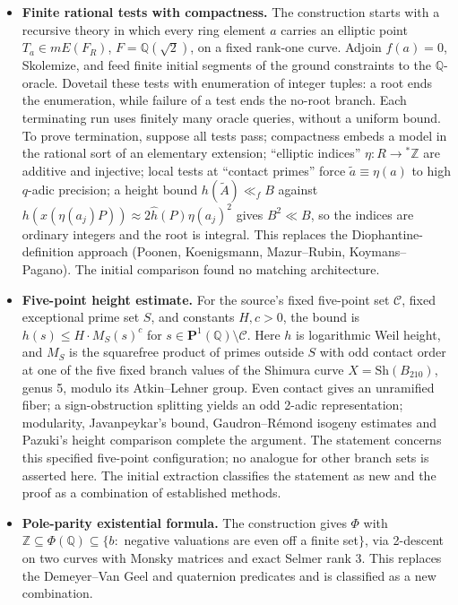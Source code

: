 \documentclass[11pt]{article}
\begin{document}
\begin{itemize}
\item \textbf{Finite rational tests with compactness.} The construction starts with a recursive theory in which every ring element $a$ carries an elliptic point $T_a\in mE(F_R)$, $F=\mathbb Q(\sqrt2)$, on a fixed rank-one curve. Adjoin $f(a)=0$, Skolemize, and feed finite initial segments of the ground constraints to the $\mathbb{Q}$-oracle. Dovetail these tests with enumeration of integer tuples: a root ends the enumeration, while failure of a test ends the no-root branch. Each terminating run uses finitely many oracle queries, without a uniform bound. To prove termination, suppose all tests pass; compactness embeds a model in the rational sort of an elementary extension; ``elliptic indices'' $\eta:R\to{}^*\mathbb Z$ are additive and injective; local tests at ``contact primes'' force $\tilde a\equiv\eta(a)$ to high $q$-adic precision; a height bound $h(\tilde A)\ll_f B$ against $h(x(\eta(a_j)P))\approx2\hat h(P)\eta(a_j)^2$ gives $B^2\ll B$, so the indices are ordinary integers and the root is integral. This replaces the Diophantine-definition approach (Poonen, Koenigsmann, Mazur--Rubin, Koymans--Pagano). The initial comparison found no matching architecture.
\item \textbf{Five-point height estimate.} For the source's fixed five-point set $\mathcal C$, fixed exceptional prime set $S$, and constants $H,c>0$, the bound is $h(s)\le H\cdot M_S(s)^c$ for $s\in\mathbf P^1(\mathbb Q)\setminus\mathcal C$. Here $h$ is logarithmic Weil height, and $M_S$ is the squarefree product of primes outside $S$ with odd contact order at one of the five fixed branch values of the Shimura curve $X=\mathrm{Sh}(B_{210})$, genus 5, modulo its Atkin--Lehner group. Even contact gives an unramified fiber; a sign-obstruction splitting yields an odd 2-adic representation; modularity, Javanpeykar's bound, Gaudron--Rémond isogeny estimates and Pazuki's height comparison complete the argument. The statement concerns this specified five-point configuration; no analogue for other branch sets is asserted here. The initial extraction classifies the statement as new and the proof as a combination of established methods.
\item \textbf{Pole-parity existential formula.} The construction gives $\Phi$ with $\mathbb{Z}\subseteq\Phi(\mathbb{Q})\subseteq\{b:{}$ negative valuations are even off a finite set$\}$, via 2-descent on two curves with Monsky matrices and exact Selmer rank 3. This replaces the Demeyer--Van Geel and quaternion predicates and is classified as a new combination.
\end{itemize}
\end{document}

